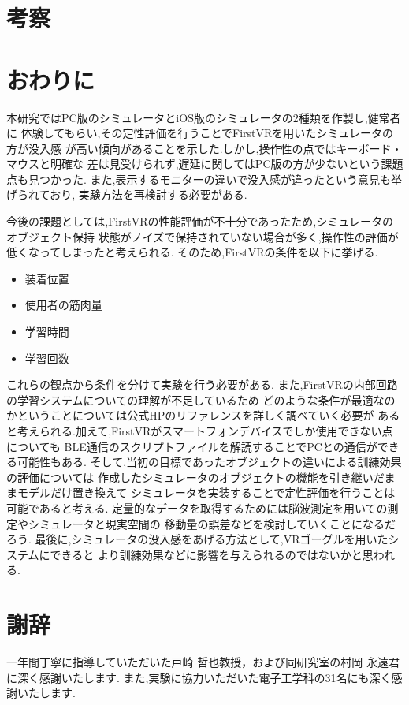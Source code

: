 \documentclass{ltjsreport}
\begin{document}
\chapter{考察}
	

\chapter{おわりに}
	本研究ではPC版のシミュレータとiOS版のシミュレータの2種類を作製し,健常者に
	体験してもらい,その定性評価を行うことでFirstVRを用いたシミュレータの方が没入感
	が高い傾向があることを示した.しかし,操作性の点ではキーボード・マウスと明確な
	差は見受けられず,遅延に関してはPC版の方が少ないという課題点も見つかった.
	また,表示するモニターの違いで没入感が違ったという意見も挙げられており,
	実験方法を再検討する必要がある.

	今後の課題としては,FirstVRの性能評価が不十分であったため,シミュレータのオブジェクト保持
	状態がノイズで保持されていない場合が多く,操作性の評価が低くなってしまったと考えられる.
	そのため,FirstVRの条件を以下に挙げる.
	\begin{itemize}
		\item 装着位置
		\item 使用者の筋肉量
		\item 学習時間
		\item 学習回数
	\end{itemize}
	これらの観点から条件を分けて実験を行う必要がある.
	また,FirstVRの内部回路の学習システムについての理解が不足しているため
	どのような条件が最適なのかということについては公式HPのリファレンスを詳しく調べていく必要が
	あると考えられる.加えて,FirstVRがスマートフォンデバイスでしか使用できない点についても
	BLE通信のスクリプトファイルを解読することでPCとの通信ができる可能性もある.
	そして,当初の目標であったオブジェクトの違いによる訓練効果の評価については
	作成したシミュレータのオブジェクトの機能を引き継いだままモデルだけ置き換えて
	シミュレータを実装することで定性評価を行うことは可能であると考える.
	定量的なデータを取得するためには脳波測定を用いての測定やシミュレータと現実空間の
	移動量の誤差などを検討していくことになるだろう.
	最後に,シミュレータの没入感をあげる方法として,VRゴーグルを用いたシステムにできると
	より訓練効果などに影響を与えられるのではないかと思われる.
\clearpage

\chapter*{謝辞}
一年間丁寧に指導していただいた戸崎 哲也教授，および同研究室の村岡 永遠君に深く感謝いたします.
また,実験に協力いただいた電子工学科の31名にも深く感謝いたします.
\end{document}
